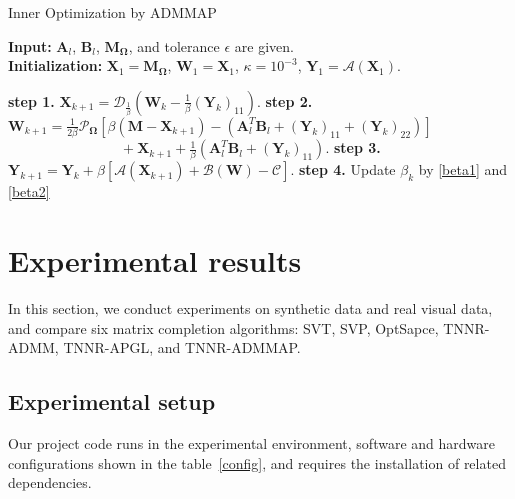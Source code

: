 \documentclass[fontset=windows]{article}
\begin{document}
{\begin{algorithm}[t]
    \caption{Inner Optimization by ADMMAP}
    \label{algo4}
    \textbf{Input:} $\mathbf A_l$, $\mathbf B_l$, $\mathbf M_{\mathbf\Omega}$, and tolerance $\epsilon$ are given.\\
    \textbf{Initialization:} $\mathbf X_1 = \mathbf M_{\mathbf\Omega}$, $\mathbf W_1=\mathbf X_1$,  $\kappa = 10^{-3}$, $\mathbf Y_1= \mathcal{A}(\mathbf X_1)$.
    \begin{algorithmic}
        \Repeat 
        \State \textbf{step 1.} $\mathbf X_{k+1} = \mathcal{D}_{\frac{1}{\beta}}\left(\mathbf W_k - \frac{1}{\beta}(\mathbf Y_k)_{11}\right)$.
        \State \textbf{step 2.} $\mathbf W_{k+1} = \frac{1}{2\beta} \mathcal{P}_{\mathbf\Omega} [\beta(\mathbf M-\mathbf X_{k+1}) - (\mathbf A_l^T\mathbf B_l + (\mathbf Y_k)_{11}+ (\mathbf Y_k)_{22})]$ \\
        $ \quad\quad\quad\quad\quad\quad\quad\quad+ \mathbf X_{k+1} +  \frac{1}{\beta}(\mathbf A_l^T\mathbf B_l + (\mathbf Y_k)_{11})$.
        \State \textbf{step 3.} $\mathbf Y_{k+1} = \mathbf Y_{k}+\beta[\mathcal{A}(\mathbf X_{k+1})+\mathcal{B}(\mathbf W)-\mathcal{C}]$.
        \State \textbf{step 4.} Update $\beta_k$ by \eqref{beta1} and \eqref{beta2}
    \end{algorithmic}
\end{algorithm}



\section{Experimental results}
\label{s4}

In this section, we conduct experiments on synthetic data and real visual data, and compare six matrix completion algorithms: SVT, SVP, OptSapce, TNNR-ADMM, TNNR-APGL, and TNNR-ADMMAP.


\subsection{Experimental setup}

Our project code runs in the experimental environment, software and hardware configurations shown in the table~\ref{config}, and requires the installation of related dependencies.

}
\end{document}

